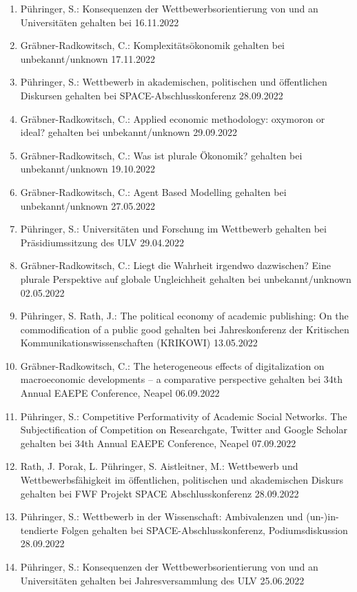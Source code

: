 \begin{enumerate}
	\item Pühringer, S.: Konsequenzen der Wettbewerbsorientierung von und an Universitäten gehalten bei  16.11.2022
	\item Gräbner-Radkowitsch, C.: Komplexitätsökonomik gehalten bei unbekannt/unknown 17.11.2022
	\item Pühringer, S.: Wettbewerb in akademischen, politischen und öffentlichen Diskursen gehalten bei SPACE-Abschlusskonferenz 28.09.2022
	\item Gräbner-Radkowitsch, C.: Applied economic methodology: oxymoron or ideal? gehalten bei unbekannt/unknown 29.09.2022
	\item Gräbner-Radkowitsch, C.: Was ist plurale Ökonomik? gehalten bei unbekannt/unknown 19.10.2022
	\item Gräbner-Radkowitsch, C.: Agent Based Modelling gehalten bei unbekannt/unknown 27.05.2022
	\item Pühringer, S.: Universitäten und Forschung im Wettbewerb gehalten bei Präsidiumssitzung des ULV 29.04.2022
	\item Gräbner-Radkowitsch, C.: Liegt die Wahrheit irgendwo dazwischen? Eine plurale Perspektive auf globale Ungleichheit gehalten bei unbekannt/unknown 02.05.2022
	\item Pühringer, S. Rath, J.: The political economy of academic publishing: On the commodification of a public good gehalten bei Jahreskonferenz der Kritischen Kommunikationswissenschaften (KRIKOWI) 13.05.2022
	\item Gräbner-Radkowitsch, C.: The heterogeneous effects of digitalization on macroeconomic developments -- a comparative perspective gehalten bei 34th Annual EAEPE Conference, Neapel 06.09.2022
	\item Pühringer, S.: Competitive Performativity of Academic Social Networks. The Subjectification of Competition on Researchgate, Twitter and Google Scholar gehalten bei 34th Annual EAEPE Conference, Neapel 07.09.2022
	\item Rath, J. Porak, L. Pühringer, S. Aistleitner, M.: Wettbewerb und Wettbewerbsfähigkeit im öffentlichen, politischen und akademischen Diskurs gehalten bei FWF Projekt \glqq SPACE\grqq{} Abschlusskonferenz 28.09.2022
	\item Pühringer, S.: Wettbewerb in der Wissenschaft: Ambivalenzen und (un-)in-tendierte Folgen gehalten bei SPACE-Abschlusskonferenz, Podiumsdiskussion 28.09.2022
	\item Pühringer, S.: Konsequenzen der Wettbewerbsorientierung von und an Universitäten gehalten bei Jahresversammlung des ULV 25.06.2022

\end{enumerate}
